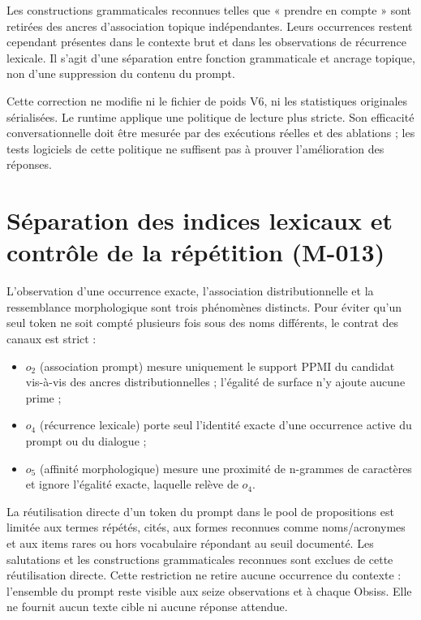 \documentclass[11pt,a4paper]{report}
\begin{document}
Les constructions grammaticales reconnues telles que « prendre en compte » sont retirées des ancres d'association topique indépendantes. Leurs occurrences restent cependant présentes dans le contexte brut et dans les observations de récurrence lexicale. Il s'agit d'une séparation entre fonction grammaticale et ancrage topique, non d'une suppression du contenu du prompt.

Cette correction ne modifie ni le fichier de poids V6, ni les statistiques originales sérialisées. Le runtime applique une politique de lecture plus stricte. Son efficacité conversationnelle doit être mesurée par des exécutions réelles et des ablations ; les tests logiciels de cette politique ne suffisent pas à prouver l'amélioration des réponses.




\section{Séparation des indices lexicaux et contrôle de la répétition (M-013)}
\label{sec:m013-lexical}

L'observation d'une occurrence exacte, l'association distributionnelle et la ressemblance morphologique sont trois phénomènes distincts. Pour éviter qu'un seul token ne soit compté plusieurs fois sous des noms différents, le contrat des canaux est strict :
\begin{itemize}
\item $o_2$ (association prompt) mesure uniquement le support PPMI du candidat vis-à-vis des ancres distributionnelles ; l'égalité de surface n'y ajoute aucune prime ;
\item $o_4$ (récurrence lexicale) porte seul l'identité exacte d'une occurrence active du prompt ou du dialogue ;
\item $o_5$ (affinité morphologique) mesure une proximité de n-grammes de caractères et ignore l'égalité exacte, laquelle relève de $o_4$.
\end{itemize}

La réutilisation directe d'un token du prompt dans le pool de propositions est limitée aux termes répétés, cités, aux formes reconnues comme noms/acronymes et aux items rares ou hors vocabulaire répondant au seuil documenté. Les salutations et les constructions grammaticales reconnues sont exclues de cette réutilisation directe. Cette restriction ne retire aucune occurrence du contexte : l'ensemble du prompt reste visible aux seize observations et à chaque Obsiss. Elle ne fournit aucun texte cible ni aucune réponse attendue.
\end{document}

